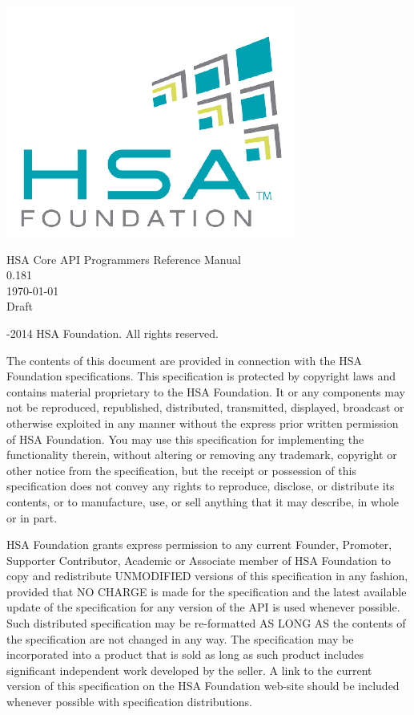 \documentclass[draft]{book}
\newcommand{\docversion}{0.181}
\begin{document}
\hypersetup{pageanchor=false,citecolor=black}
\begin{titlepage}
\includegraphics[width=.5\textwidth]{fig/foundation.png}
\vspace*{7cm}
\begin{center}
{\Large HSA Core API Programmers Reference Manual\\[1ex]\large\docversion}\\
\vspace*{1cm}
\vspace*{0.5cm}
{\small \today}\\
\vspace*{0.5cm}
{\small Draft}\\
\end{center}
\end{titlepage}
\thispagestyle{empty} {-2014 HSA Foundation. All rights
  reserved.}


The contents of this document are provided in connection with the HSA Foundation
specifications. This specification is protected by copyright laws and contains
material proprietary to the HSA Foundation. It or any components may not be
reproduced, republished, distributed, transmitted, displayed, broadcast or
otherwise exploited in any manner without the express prior written permission
of HSA Foundation. You may use this specification for implementing the
functionality therein, without altering or removing any trademark, copyright or
other notice from the specification, but the receipt or possession of this
specification does not convey any rights to reproduce, disclose, or distribute
its contents, or to manufacture, use, or sell anything that it may describe, in
whole or in part.

HSA Foundation grants express permission to any current Founder, Promoter,
Supporter Contributor, Academic or Associate member of HSA Foundation to copy
and redistribute UNMODIFIED versions of this specification in any fashion,
provided that NO CHARGE is made for the specification and the latest available
update of the specification for any version of the API is used whenever
possible. Such distributed specification may be re-formatted AS LONG AS the
contents of the specification are not changed in any way. The specification may
be incorporated into a product that is sold as long as such product includes
significant independent work developed by the seller. A link to the current
version of this specification on the HSA Foundation web-site should be included
whenever possible with specification distributions.
\end{document}
